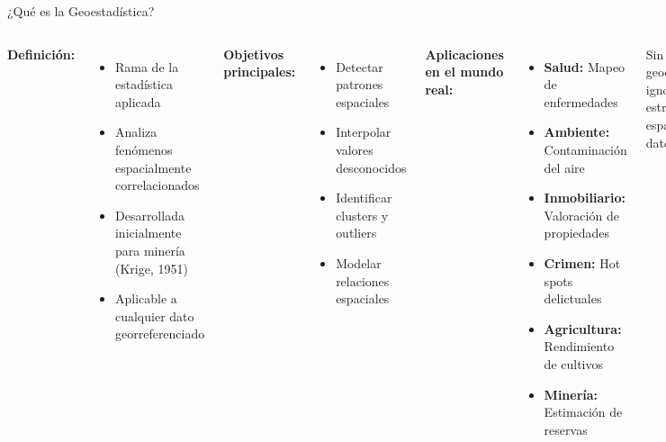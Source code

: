 \documentclass[10pt,aspectratio=169]{beamer}
\newcommand{\alertbox}[1]{
\begin{tcolorbox}[colframe=red!70,colback=red!5]
\centering\faExclamationTriangle\space #1
\end{tcolorbox}
}
\begin{document}
\begin{frame}{¿Qué es la Geoestadística?}
    \begin{columns}[T]
        \textbf{Definición:}
        \begin{itemize}
            \item Rama de la estadística aplicada
            \item Analiza fenómenos espacialmente correlacionados
            \item Desarrollada inicialmente para minería (Krige, 1951)
            \item Aplicable a cualquier dato georreferenciado
        \end{itemize}
        
        \vspace{0.3cm}
        \textbf{Objetivos principales:}
        \begin{itemize}
            \item \faChartLine\space Detectar patrones espaciales
            \item \faMap\space Interpolar valores desconocidos
            \item \faSearch\space Identificar clusters y outliers
            \item \faCalculator\space Modelar relaciones espaciales
        \end{itemize}
        
        \textbf{Aplicaciones en el mundo real:}
        \begin{itemize}
            \item \textbf{Salud:} Mapeo de enfermedades
            \item \textbf{Ambiente:} Contaminación del aire
            \item \textbf{Inmobiliario:} Valoración de propiedades
            \item \textbf{Crimen:} Hot spots delictuales
            \item \textbf{Agricultura:} Rendimiento de cultivos
            \item \textbf{Minería:} Estimación de reservas
        \end{itemize}
        
        \vspace{0.3cm}
        \alertbox{Sin geoestadística, ignoramos la estructura espacial de los datos}
    \end{columns}
\end{frame}
\end{document}

